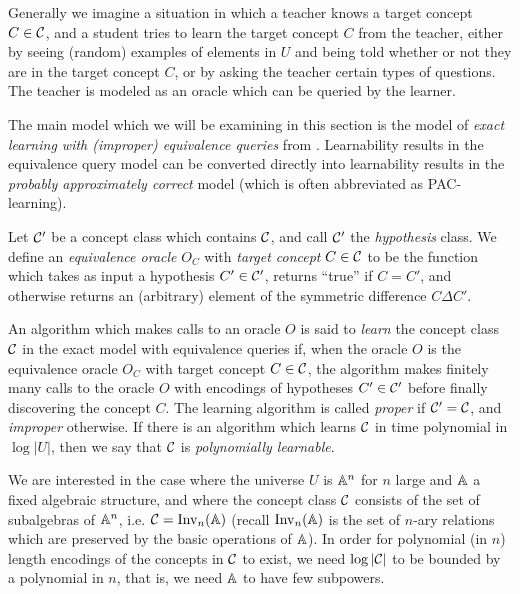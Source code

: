 \documentclass[letterpaper,11pt]{article}
\DeclareMathOperator{\Inv}{Inv}
\begin{document}
Generally we imagine a situation in which a teacher knows a target concept $C \in \mathcal{C}$, and a student tries to learn the target concept $C$ from the teacher, either by seeing (random) examples of elements in $U$ and being told whether or not they are in the target concept $C$, or by asking the teacher certain types of questions. The teacher is modeled as an oracle which can be queried by the learner.

The main model which we will be examining in this section is the model of \emph{exact learning with (improper) equivalence queries} from \cite{angluin-learning}. Learnability results in the equivalence query model can be converted directly into learnability results in the \emph{probably approximately correct} model (which is often abbreviated as PAC-learning).

\begin{defn} Let $\mathcal{C}'$ be a concept class which contains $\mathcal{C}$, and call $\mathcal{C}'$ the \emph{hypothesis} class. We define an \emph{equivalence oracle} $O_C$ with \emph{target concept} $C \in \mathcal{C}$ to be the function which takes as input a hypothesis $C' \in \mathcal{C}'$, returns ``true'' if $C = C'$, and otherwise returns an (arbitrary) element of the symmetric difference $C\Delta C'$.
\end{defn}

\begin{defn} An algorithm which makes calls to an oracle $O$ is said to \emph{learn} the concept class $\mathcal{C}$ in the exact model with equivalence queries if, when the oracle $O$ is the equivalence oracle $O_C$ with target concept $C \in \mathcal{C}$, the algorithm makes finitely many calls to the oracle $O$ with encodings of hypotheses $C' \in \mathcal{C}'$ before finally discovering the concept $C$. The learning algorithm is called \emph{proper} if $\mathcal{C}' = \mathcal{C}$, and \emph{improper} otherwise. If there is an algorithm which learns $\mathcal{C}$ in time polynomial in $\log |U|$, then we say that $\mathcal{C}$ is \emph{polynomially learnable}.
\end{defn}

We are interested in the case where the universe $U$ is $\mathbb{A}^n$ for $n$ large and $\mathbb{A}$ a fixed algebraic structure, and where the concept class $\mathcal{C}$ consists of the set of subalgebras of $\mathbb{A}^n$, i.e. $\cC = \Inv_n(\bA)$ (recall $\Inv_n(\bA)$ is the set of $n$-ary relations which are preserved by the basic operations of $\mathbb{A}$). In order for polynomial (in $n$) length encodings of the concepts in $\mathcal{C}$ to exist, we need $\log |\mathcal{C}|$ to be bounded by a polynomial in $n$, that is, we need $\mathbb{A}$ to have few subpowers.
\end{document}
